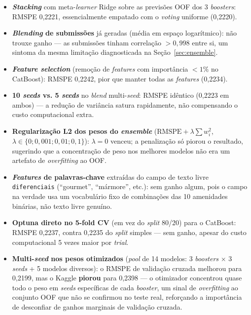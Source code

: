 \documentclass[12pt, a4paper]{article}
\newcommand{\code}[1]{\texttt{#1}}
\begin{document}
\begin{itemize}[leftmargin=2em]
  \item \textbf{\textit{Stacking}} com meta-\textit{learner} Ridge sobre as previsões OOF dos 3 \textit{boosters}: RMSPE 0,2221, essencialmente empatado com o \textit{voting} uniforme (0,2220).
  \item \textbf{\textit{Blending} de submissões} já geradas (média em espaço logarítmico): não trouxe ganho --- as submissões tinham correlação $> 0{,}998$ entre si, um sintoma da mesma limitação diagnosticada na Seção~\ref{sec:ensemble}.
  \item \textbf{\textit{Feature selection}} (remoção de \textit{features} com importância $< 1\%$ no CatBoost): RMSPE 0,2242, pior que manter todas as \textit{features} (0,2234).
  \item \textbf{10 \textit{seeds} vs. 5 \textit{seeds}} no \textit{blend} multi-\textit{seed}: RMSPE idêntico (0,2223 em ambos) --- a redução de variância satura rapidamente, não compensando o custo computacional extra.
  \item \textbf{Regularização L2 dos pesos do \textit{ensemble}} ($\text{RMSPE} + \lambda \sum w_i^2$, $\lambda \in \{0; 0{,}001; 0{,}01; 0{,}1\}$): $\lambda = 0$ venceu; a penalização só piorou o resultado, sugerindo que a concentração de peso nos melhores modelos não era um artefato de \textit{overfitting} ao OOF.
  \item \textbf{\textit{Features} de palavras-chave} extraídas do campo de texto livre \code{diferenciais} (``gourmet'', ``mármore'', etc.): sem ganho algum, pois o campo na verdade usa um vocabulário fixo de combinações das 10 amenidades binárias, não texto livre genuíno.
  \item \textbf{Optuna direto no 5-fold CV} (em vez do \textit{split} 80/20) para o CatBoost: RMSPE 0,2237, contra 0,2235 do \textit{split} simples --- sem ganho, apesar do custo computacional 5 vezes maior por \textit{trial}.
  \item \textbf{Multi-\textit{seed} nos pesos otimizados} (\textit{pool} de 14 modelos: 3 \textit{boosters} $\times$ 3 \textit{seeds} + 5 modelos diversos): o RMSPE de validação cruzada melhorou para 0,2199, mas o Kaggle \textbf{piorou} para 0,2398 --- o otimizador concentrou quase todo o peso em \textit{seeds} específicas de cada \textit{booster}, um sinal de \textit{overfitting} ao conjunto OOF que não se confirmou no teste real, reforçando a importância de desconfiar de ganhos marginais de validação cruzada.
\end{itemize}
\end{document}
